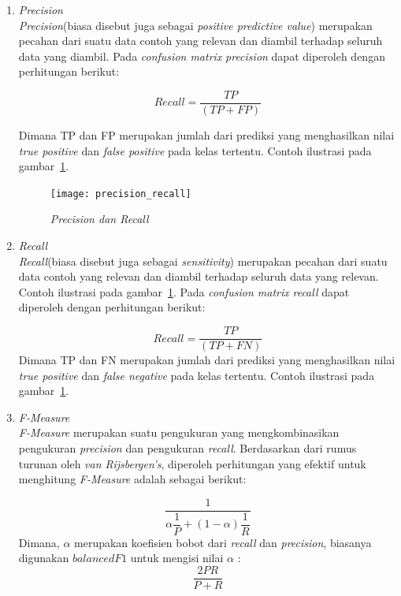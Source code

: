 \begin{enumerate}
	 \item \textit{Precision}\\
	 \textit{Precision}(biasa disebut juga sebagai \textit{positive predictive value}) merupakan pecahan dari suatu data contoh yang relevan dan diambil terhadap seluruh data yang diambil. Pada \textit{confusion matrix} \textit{precision} dapat diperoleh dengan perhitungan berikut:

	 \begin{equation}
	 	Recall = \dfrac{TP}{(TP + FP)}
	 \end{equation}
	 
	 Dimana TP dan FP merupakan jumlah dari prediksi yang menghasilkan nilai \textit{true positive} dan \textit{false positive} pada kelas tertentu. Contoh ilustrasi pada gambar~\ref{fig:precision_recall}. 
	 
	\begin{figure}[H]
	\centering
	\texttt{[image: precision\_recall]}
	\caption[\textit{Precision dan Recall}, diambil dari \url{https://en.wikipedia.org/wiki/Precision_and_recall}]{\textit{Precision dan Recall}\footnotemark}
	\label{fig:precision_recall}
\end{figure}

	 \item \textit{Recall}\\
	 \textit{Recall}(biasa disebut juga sebagai \textit{sensitivity}) merupakan pecahan dari suatu data contoh yang relevan dan diambil terhadap seluruh data yang relevan. Contoh ilustrasi pada gambar~\ref{fig:precision_recall}. Pada \textit{confusion matrix} \textit{recall} dapat diperoleh dengan perhitungan berikut:

	 \begin{equation}
	 	Recall = \dfrac{TP}{(TP + FN)}
	 \end{equation}
	Dimana TP dan FN merupakan jumlah dari prediksi yang menghasilkan nilai \textit{true positive} dan \textit{false negative} pada kelas tertentu. Contoh ilustrasi pada gambar~\ref{fig:precision_recall}. 	 
	 
	 \item \textit{F-Measure}\\
	  \textit{F-Measure} merupakan suatu pengukuran yang mengkombinasikan pengukuran \textit{precision} dan pengukuran \textit{recall}. Berdasarkan dari rumus turunan oleh \textit{van Rijsbergen's}, diperoleh perhitungan yang efektif untuk menghitung \textit{F-Measure} adalah sebagai berikut:
	 
	 \begin{equation}
	 	\dfrac{1}{\alpha \dfrac{1}{P} + (1 - \alpha)\dfrac{1}{R}}
	 \end{equation}
	 Dimana, $\alpha$ merupakan koefisien bobot dari \textit{recall} dan \textit{precision}, biasanya digunakan $balanced F1$ untuk mengisi nilai $\alpha$ :
	 \begin{equation}
	 	\dfrac{2PR}{P + R}
	 \end{equation}

\end{enumerate}


